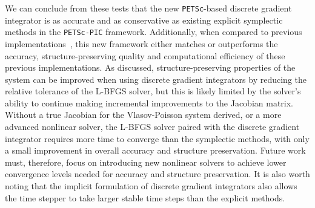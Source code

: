 \documentclass[preprint,12pt]{elsarticle}
\theoremstyle{definition}
\begin{document}
We can conclude from these tests that the new \texttt{PETSc}-based discrete gradient integrator is as accurate and as conservative as existing explicit symplectic methods in the \texttt{PETSc-PIC} framework. Additionally, when compared to previous implementations~\cite{Kraus2017_GEMPIC,Hu2024}, this new framework either matches or outperforms the accuracy, structure-preserving quality and computational efficiency of these previous implementations. As discussed, structure-preserving properties of the system can be improved when using discrete gradient integrators by reducing the relative tolerance of the L-BFGS solver, but this is likely limited by the solver's ability to continue making incremental improvements to the Jacobian matrix. Without a true Jacobian for the Vlasov-Poisson system derived, or a more advanced nonlinear solver, the L-BFGS solver paired with the discrete gradient integrator requires more time to converge than the symplectic methods, with only a small improvement in overall accuracy and structure preservation. Future work must, therefore, focus on introducing new nonlinear solvers to achieve lower convergence levels needed for accuracy and structure preservation. It is also worth noting that the implicit formulation of discrete gradient integrators also allows the time stepper to take larger stable time steps than the explicit methods.

\end{document}
